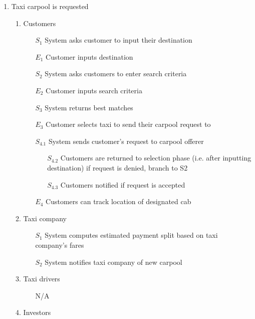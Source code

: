 \documentclass[]{article}
\begin{document}
\begin{enumerate}[{\textbf{BE}}1.]
\begin{enumerate}[{VP2}.1]
\begin{enumerate}
\begin{enumerate}
                \end{enumerate}
            \end{enumerate}
    \end{enumerate}
    \item Taxi carpool is requested
    \begin{enumerate}[{VP3}.1]
        \item Customers
            \begin{enumerate}
                \item[$S_1$] System asks customer to input their destination
                \item[$E_1$] Customer inputs destination
	     \item[$S_2$] System asks customers to enter search criteria
	     \item[$E_2$] Customer inputs search criteria
 	     \item[$S_3$] System returns best matches
                \item[$E_3$] Customer selects taxi to send their carpool request to
\item[$S_{4.1}$] System sends customer's request to carpool offerer
                \begin{enumerate}
                    \item[$S_{4.2}$] Customers are returned to selection phase (i.e. after inputting destination) if request is denied, branch to S2
                    \item[$S_{4.3}$] Customers notified if request is accepted
                \end{enumerate}
                \item[$E_4$] Customers can track location of designated cab
            \end{enumerate}
        \item Taxi company
            \begin{enumerate}
                \item[$S_1$] System computes estimated payment split based on taxi company's fares
	        \item[$S_2$] System notifies taxi company of new carpool
            \end{enumerate}
        \item Taxi drivers
            \begin{enumerate}
                \item[N/A]
            \end{enumerate}
        \item Investors

\end{enumerate}
\end{enumerate}
\end{document}

